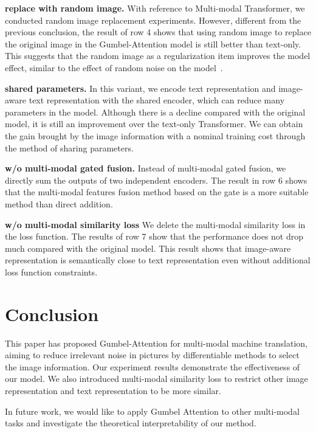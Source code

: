 \documentclass[11pt]{article}
\begin{document}
\textbf{replace with random image.}
With reference to Multi-modal Transformer, we conducted random image replacement experiments.  
However, different from the previous conclusion, the result of row 4 shows that using random image to replace the original image in the Gumbel-Attention model is still better than text-only. 
This suggests that the random image as a regularization item improves the model effect, similar to the effect of random noise on the model~\citep{DBLP:journals/neco/Bishop95}.



\textbf{shared parameters.}
In this variant, we encode text representation and image-aware text representation with the shared encoder, which can reduce many parameters in the model. Although there is a decline compared with the original model, it is still an improvement over the text-only Transformer. We can obtain the gain brought by the image information with a nominal training cost through the method of sharing parameters.

\textbf{w/o multi-modal gated fusion.}
Instead of multi-modal gated fusion, we directly sum the outputs of two independent encoders. The result in row 6 shows that the multi-modal features fusion method based on the gate is a more suitable method than direct addition.  


\textbf{w/o multi-modal similarity loss}
We delete the multi-modal similarity loss in the loss function. The results of row 7 show that the performance does not drop much compared with the original model. This result shows that image-aware representation is semantically close to text representation even without additional loss function constraints.




\section{Conclusion}
This paper has proposed Gumbel-Attention for multi-modal machine translation, aiming to reduce irrelevant noise in pictures by differentiable methods to select the image information. Our experiment results demonstrate the effectiveness of our model. We also introduced multi-modal similarity loss to restrict other image representation and text representation to be more similar. 

In future work, we would like to apply Gumbel Attention to other multi-modal tasks and investigate the theoretical interpretability of our method.



\end{document}
